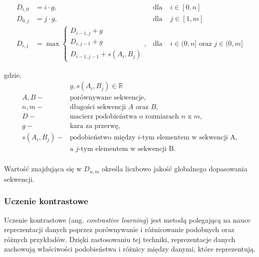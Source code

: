            \begin{equation}
                \begin{aligned}
                    D_{i,0} &= i \cdot g, & \text{dla } & i \in [0, n] \\
                    D_{0,j} &= j \cdot g, & \text{dla } & j \in [1, m] \\
                    D_{i,j} &= \max
                    \begin{cases}
                    D_{i - 1, j} + g \\
                    D_{i, j - 1} + g \\
                    D_{i - 1, j - 1} + s(A_i, B_j)
                    \end{cases}, & \text{dla } & i \in (0, n] \text{ oraz } j \in (0, m]
                \end{aligned}
                \label{Equation:NeedlemanWunsch}
            \end{equation}

            gdzie,
            \begin{align*} 
                & g, s(A_i, B_j) \in \mathbb{R} \\
                A, B -& \text{porównywane sekwencje}, \\
                n, m -& \text{długości sekwencji } A \text{ oraz } B, \\
                D -& \text{macierz podobieństwa o rozmiarach } n \text{ x } m, \\
                g -& \text{kara za przerwę}, \\
                s(A_i, B_j) -& \text{podobieństwo między  } i\text{-tym elementem w sekwencji A,} \\ 
                & \text{a } j \text{-tym elementem w sekwencji B}. \\
            \end{align*}

            Wartość znajdująca się w $D_{n, m}$ określa liczbowo jakość globalnego dopasowania sekwencji.

        \subsubsection{Uczenie kontrastowe}

            Uczenie kontrastowe (ang. \textit{contrastive learning}) \cite{Bromley1993} jest metodą polegającą na nauce reprezentacji danych poprzez porównywanie i różnicowanie podobnych oraz różnych przykładów. Dzięki zastosowaniu tej techniki, reprezentacje danych zachowują właściwości podobieństwa i różnicy między danymi, które reprezentują.

